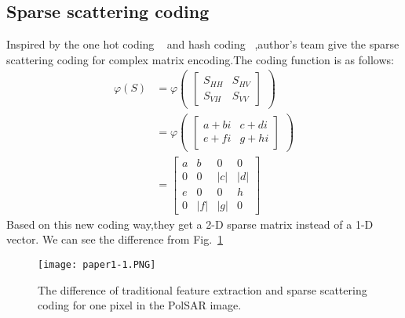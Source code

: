 \documentclass[10pt,twocolumn,letterpaper]{article}
\begin{document}
\subsection{Sparse scattering coding}
	Inspired by the one hot coding ~\cite{Digital2010_11} and hash coding ~\cite{massive2014_12},author's team give the sparse scattering coding for complex matrix encoding.The coding function is as follows:
\begin{equation}
\begin{aligned}
\varphi(S) &= \varphi \begin{pmatrix}
\begin{bmatrix}
S_{HH} & S_{HV}\\S_{VH} & S_{VV}
\end{bmatrix}
\end{pmatrix} \\&= \varphi \begin{pmatrix}
\begin{bmatrix}
a+bi & c+di \\ e+fi & g+hi
\end{bmatrix}
\end{pmatrix} \\ &= \begin{bmatrix}
a & b & 0 & 0\\0 & 0 & |c| & |d|\\e & 0 & 0 & h\\0 & |f | & |g| & 0
\end{bmatrix}
\end{aligned}
\end{equation}
Based on this new coding way,they get a 2-D sparse matrix instead of  a 1-D vector. We can see the difference from Fig.~\ref{fig:activefunction}
\begin{figure}[htb]
\centering
\texttt{[image: paper1-1.PNG]}
\caption{The difference of traditional feature extraction and sparse scattering
coding for one pixel in the PolSAR image.}
\label{fig:activefunction}
\end{figure}
\end{document}
